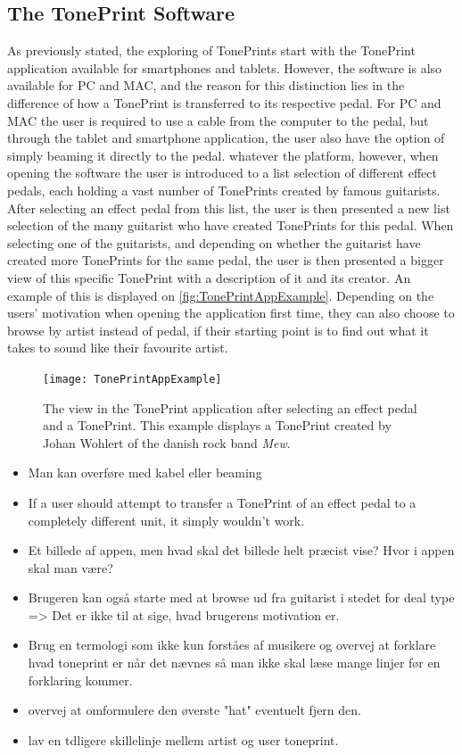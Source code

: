 \subsection{The TonePrint Software}
\label{TonePrintSoftware}
As previously stated, the exploring of TonePrints start with the TonePrint application available for smartphones and tablets. However, the software is also available for PC and MAC, and the reason for this distinction lies in the difference of how a TonePrint is transferred to its respective pedal. For PC and MAC the user is required to use a cable from the computer to the pedal, but through the tablet and smartphone application, the user also have the option of simply beaming it directly to the pedal. whatever the platform, however, when opening the software the user is introduced to a list selection of different effect pedals, each holding a vast number of TonePrints created by famous guitarists. After selecting an effect pedal from this list, the user is then presented a new list selection of the many guitarist who have created TonePrints for this pedal. When selecting one of the guitarists, and depending on whether the guitarist have created more TonePrints for the same pedal, the user is then presented a bigger view of this specific TonePrint with a description of it and its creator. An example of this is displayed on \autoref{fig:TonePrintAppExample}. Depending on the users' motivation when opening the application first time, they can also choose to browse by artist instead of pedal, if their starting point is to find out what it takes to sound like their favourite artist.

\begin{figure}[H]
	\centering
	\texttt{[image: TonePrintAppExample]}
	\caption{The view in the TonePrint application after selecting an effect pedal and a TonePrint. This example displays a TonePrint created by Johan Wohlert of the danish rock band \textit{Mew}.}
	\label{fig:TonePrintAppExample}
\end{figure}
\noindent

\begin{itemize}
	\item Man kan overføre med kabel eller beaming
	\item If a user should attempt to transfer a TonePrint of an effect pedal to a completely different unit, it simply wouldn't work.
	\item Et billede af appen, men hvad skal det billede helt præcist vise? Hvor i appen skal man være?
	\item Brugeren kan også starte med at browse ud fra guitarist i stedet for deal type => Det er ikke til at sige, hvad brugerens motivation er.
    \item Brug en termologi som ikke kun forståes af musikere og overvej at forklare hvad toneprint er når det nævnes så man ikke skal læse mange linjer før en forklaring kommer.
    \item overvej at omformulere den øverste "hat" eventuelt fjern den.
    \item lav en tdligere skillelinje mellem artist og user toneprint.
\end{itemize}

